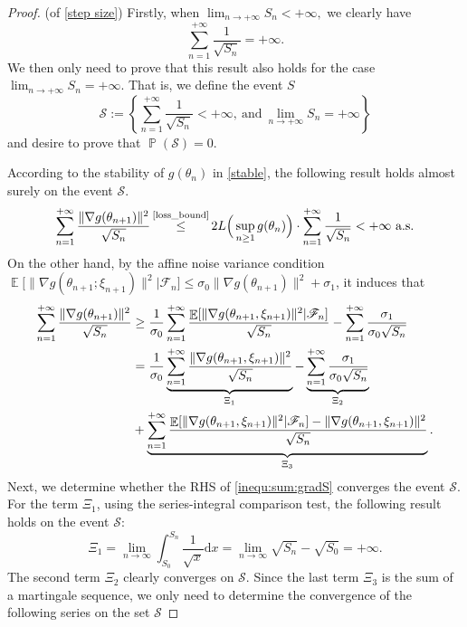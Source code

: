 \documentclass[standalone]{article}
\DeclareMathOperator{\Expect}{\mathbb{E}}
\DeclareMathOperator{\Pro}{\mathbb{P}}
\begin{document}
\begin{proof}(of \cref{step size})
Firstly, when $\lim_{n\rightarrow+\infty}S_{n} < +\infty,$ we clearly have \[\sum_{n=1}^{+\infty}\frac{1}{\sqrt{S_{n}}} = +\infty.\] We then only need to prove that this result also holds for the case $\lim_{n\rightarrow+\infty}S_{n} = +\infty.$ That is, we define the event $S$ \[\mathcal{S} := \left\{\sum_{n=1}^{+\infty}\frac{1}{\sqrt{S_{n}}} < +\infty,\ \text{and}\ \lim_{n\rightarrow+\infty}S_{n}=+\infty\right\}\] and desire to prove that \(\Pro(\mathcal{S}) = 0.\) 

According to the stability of $g(\theta_n)$ in \cref{stable}, the following result holds almost surely on the event $\mathcal{S}$.
\begin{equation}\label{wxm_03}\begin{aligned}
\sum_{n=1}^{+\infty}\frac{\|\nabla g(\theta_{n+1})\|^{2}}{\sqrt{S_{n}}} \mathop{\leq}^{\text{\cref{loss_bound}}} 2 L\Big(\sup_{n\ge 1}g(\theta_{n})\Big)\cdot\sum_{n=1}^{+\infty}\frac{1}{\sqrt{S_{n}}}<+\infty\ \text{a.s.}
\end{aligned}\end{equation}
On the other hand, by the affine noise variance condition  \( \Expect\big[\|\nabla g(\theta_{n+1};\xi_{n+1})\|^{2} \big| \mathscr{F}_{n}\big] \leq \sigma_0\|\nabla g(\theta_{n+1})\|^{2} + \sigma_{1}\), it induces that 
\begin{align}\label{inequ:sum:gradS}
\sum_{n=1}^{+\infty}\frac{\|\nabla g(\theta_{n+1})\|^{2}}{\sqrt{S_{n}}}&\ge \frac{1}{\sigma_{0}}\sum_{n=1}^{+\infty}\frac{\Expect[\|\nabla g(\theta_{n+1},\xi_{n+1})\|^{2}|\mathscr{F}_{n}]}{\sqrt{S_{n}}}-\sum_{n=1}^{+\infty}\frac{\sigma_{1}}{\sigma_{0}\sqrt{S_{n}}} \notag \\ &=\frac{1}{\sigma_{0}}\underbrace{\sum_{n=1}^{+\infty}\frac{\|\nabla g(\theta_{n+1},\xi_{n+1})\|^{2}}{\sqrt{S_{n}}}}_{\Xi_1}-\underbrace{\sum_{n=1}^{+\infty}\frac{\sigma_{1}}{\sigma_{0}\sqrt{S_{n}}}}_{\Xi_2} \notag \\&+\underbrace{\sum_{n=1}^{+\infty}\frac{\Expect[\|\nabla g(\theta_{n+1},\xi_{n+1})\|^{2}|\mathscr{F}_{n}]-\|\nabla g(\theta_{n+1},\xi_{n+1})\|^{2}}{\sqrt{S_{n}}}}_{\Xi_3}.
\end{align}
Next, we determine whether the RHS of \cref{inequ:sum:gradS} converges the event $\mathcal{S}.$ For the term $\Xi_1$, using the series-integral comparison test, the following result holds on the event $\mathcal{S}$:
\[\Xi_1 = \lim_{n \rightarrow \infty} \int_{S_{0}}^{S_{n}}\frac{1}{\sqrt{x}}\text{d}x = \lim_{n \rightarrow \infty}\sqrt{S_n} - \sqrt{S_0}=+\infty.\] The second term $\Xi_2$ clearly converges on $\mathcal{S}.$ Since the last term $\Xi_3$ is the sum of a martingale sequence, we only need to determine the convergence of the following series on the set $\mathcal{S}$

\end{proof}
\end{document}
